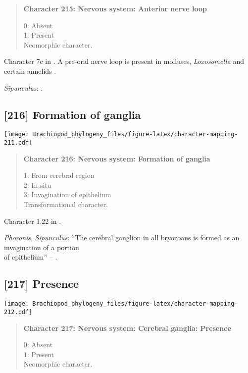 \documentclass[openany]{book}
\theoremstyle{definition}
\theoremstyle{definition}
\theoremstyle{definition}
\theoremstyle{remark}
\begin{document}
\begin{quote}
\textbf{Character 215: Nervous system: Anterior nerve loop}

0: Absent\\
1: Present\\
Neomorphic character.
\end{quote}

Character 7c in \citet{Haszprunar2008}. A pre-oral nerve loop is present
in molluscs, \emph{Loxosomella} and certain annelids
\citep{Wanninger2007}.

\hypertarget{Sipunculus-coding-215}{}
\emph{Sipunculus}: \citet{Temereva2016Thenervous}.

\subsection*{{[}216{]} Formation of ganglia}\label{formation-of-ganglia}

\texttt{[image: Brachiopod\_phylogeny\_files/figure-latex/character-mapping-211.pdf]}

\begin{quote}
\textbf{Character 216: Nervous system: Formation of ganglia}

1: From cerebral region\\
2: In situ\\
3: Invagination of epithelium\\
Transformational character.
\end{quote}

Character 1.22 in \citet{SPS1996}.

\hypertarget{Phoronis-coding-216}{}
\emph{Phoronis}, \emph{Sipunculus}: ``The cerebral ganglion in all
bryozoans is formed as an invagination of a portion\\
of epithelium'' -- \citet{Temereva2016Thenervous}.

\subsection*{{[}217{]} Presence}\label{presence-5}

\texttt{[image: Brachiopod\_phylogeny\_files/figure-latex/character-mapping-212.pdf]}

\begin{quote}
\textbf{Character 217: Nervous system: Cerebral ganglia: Presence}

0: Absent\\
1: Present\\
Neomorphic character.
\end{quote}
\end{document}
